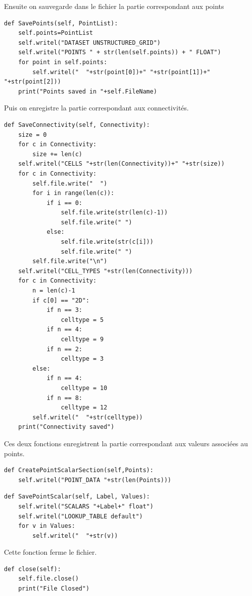 \documentclass[french]{article}
\begin{document}
Ensuite on sauvegarde dans le fichier la partie correspondant aux points

\begin{verbatim}	
def SavePoints(self, PointList):
	self.points=PointList
	self.writel("DATASET UNSTRUCTURED_GRID")
	self.writel("POINTS " + str(len(self.points)) + " FLOAT")
	for point in self.points:
		self.writel("  "+str(point[0])+" "+str(point[1])+" "+str(point[2]))
	print("Points saved in "+self.FileName)
\end{verbatim}

Puis on enregistre la partie correspondant aux connectivités.

\begin{verbatim}
def SaveConnectivity(self, Connectivity):
	size = 0
	for c in Connectivity:
		size += len(c)
	self.writel("CELLS "+str(len(Connectivity))+" "+str(size))
	for c in Connectivity:
		self.file.write("  ")
		for i in range(len(c)):
			if i == 0:
				self.file.write(str(len(c)-1))
				self.file.write(" ")
			else:
				self.file.write(str(c[i]))
				self.file.write(" ")
		self.file.write("\n")
	self.writel("CELL_TYPES "+str(len(Connectivity)))
	for c in Connectivity:
		n = len(c)-1
		if c[0] == "2D":
			if n == 3:
				celltype = 5
			if n == 4:
				celltype = 9
			if n == 2:
				celltype = 3
		else:
			if n == 4:
				celltype = 10
			if n == 8:
				celltype = 12
		self.writel("  "+str(celltype))
	print("Connectivity saved")
\end{verbatim}

Ces deux fonctions enregistrent la partie correspondant aux valeurs associées au points.

\begin{verbatim}	
def CreatePointScalarSection(self,Points):
	self.writel("POINT_DATA "+str(len(Points)))
\end{verbatim}

\begin{verbatim}
def SavePointScalar(self, Label, Values):
	self.writel("SCALARS "+Label+" float")
	self.writel("LOOKUP_TABLE default")
	for v in Values:
		self.writel("  "+str(v))
\end{verbatim}

Cette fonction ferme le fichier.

\begin{verbatim}	
def close(self):
	self.file.close()
	print("File Closed")
\end{verbatim}
\end{document}
